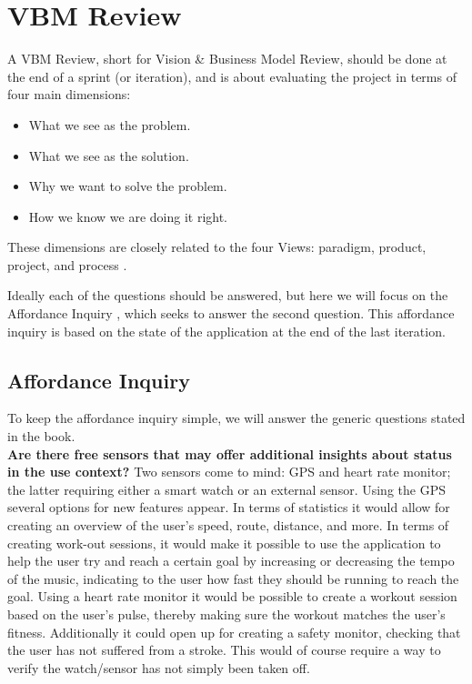 \section{VBM Review}
A VBM Review, short for Vision \& Business Model Review, should be done at the end of a sprint (or iteration), and is about evaluating the project in terms of four main dimensions:

\begin{itemize}
	\item What we see as the problem.
	\item What we see as the solution.
	\item Why we want to solve the problem.
	\item How we know we are doing it right.
\end{itemize}

These dimensions are closely related to the four Views: paradigm, product, project, and process \citep[pp. 44-47]{essence}.

Ideally each of the questions should be answered, but here we will focus on the Affordance Inquiry \citep[pp. 59-60]{essence}, which seeks to answer the second question. This affordance inquiry is based on the state of the application at the end of the last iteration.

\subsection*{Affordance Inquiry}
To keep the affordance inquiry simple, we will answer the generic questions stated in the book.\\

\noindent \textbf{Are there free sensors that may offer additional insights about status in the use context?}
Two sensors come to mind: GPS and heart rate monitor; the latter requiring either a smart watch or an external sensor.
Using the GPS several options for new features appear.
In terms of statistics it would allow for creating an overview of the user's speed, route, distance, and more.
In terms of creating work-out sessions, it would make it possible to use the application to help the user try and reach a certain goal by increasing or decreasing the tempo of the music, indicating to the user how fast they should be running to reach the goal.
Using a heart rate monitor it would be possible to create a workout session based on the user's pulse, thereby making sure the workout matches the user's fitness.
Additionally it could open up for creating a safety monitor, checking that the user has not suffered from a stroke.
This would of course require a way to verify the watch/sensor has not simply been taken off.\\

